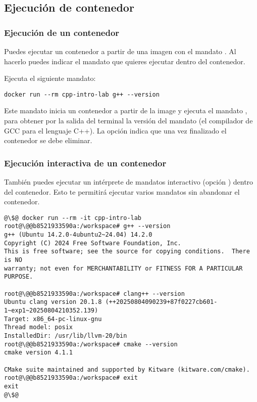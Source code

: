 \subsection{Ejecución de contenedor}

\subsubsection{Ejecución de un contenedor}

Puedes ejecutar un contenedor a partir de una imagen con el mandato 
. Al hacerlo puedes indicar el mandato que quieres
ejecutar dentro del contenedor.

Ejecuta el siguiente mandato:

\begin{lstlisting}[style=terminal]
docker run --rm cpp-intro-lab g++ --version
\end{lstlisting}

Este mandato inicia un contenedor a partir de la image 
y ejecuta el mandato , para obtener por la salida del
terminal la versión del mandato  (el compilador de GCC para el
lenguaje C++). La opción  indica que una vez finalizado el
contenedor se debe eliminar.

\subsubsection{Ejecución interactiva de un contenedor}

También puedes ejecutar un intérprete de mandatos interactivo (opción
) dentro del contenedor. Esto te permitirá ejecutar varios
mandatos sin abandonar el contenedor.

\begin{lstlisting}[style=terminal,escapechar=@]
@\$@ docker run --rm -it cpp-intro-lab
root@\@@b8521933590a:/workspace# g++ --version
g++ (Ubuntu 14.2.0-4ubuntu2~24.04) 14.2.0
Copyright (C) 2024 Free Software Foundation, Inc.
This is free software; see the source for copying conditions.  There is NO
warranty; not even for MERCHANTABILITY or FITNESS FOR A PARTICULAR PURPOSE.

root@\@@b8521933590a:/workspace# clang++ --version
Ubuntu clang version 20.1.8 (++20250804090239+87f0227cb601-1~exp1~20250804210352.139)
Target: x86_64-pc-linux-gnu
Thread model: posix
InstalledDir: /usr/lib/llvm-20/bin
root@\@@b8521933590a:/workspace# cmake --version
cmake version 4.1.1

CMake suite maintained and supported by Kitware (kitware.com/cmake).
root@\@@b8521933590a:/workspace# exit
exit
@\$@
\end{lstlisting}

